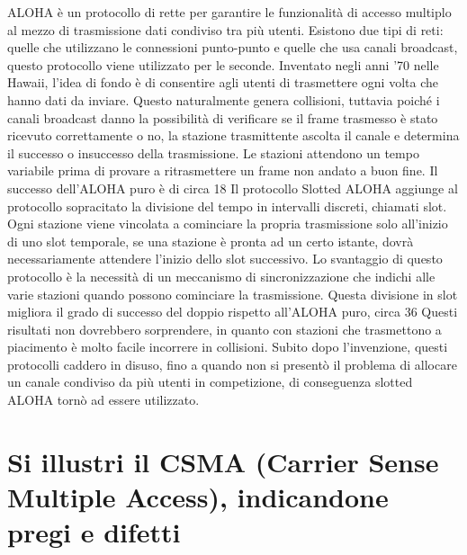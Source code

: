 ALOHA è un protocollo di rette per garantire le funzionalità di accesso multiplo al mezzo di trasmissione dati condiviso tra più utenti. Esistono due tipi di reti: quelle che utilizzano le connessioni punto-punto e quelle che usa canali broadcast, questo protocollo viene utilizzato per le seconde.
Inventato negli anni ’70 nelle Hawaii, l’idea di fondo è di consentire agli utenti di trasmettere ogni volta che hanno dati da inviare. Questo naturalmente genera collisioni, tuttavia poiché i canali broadcast danno la possibilità di verificare se il frame trasmesso è stato ricevuto correttamente o no, la stazione trasmittente ascolta il canale e determina il successo o insuccesso della trasmissione.
Le stazioni attendono un tempo variabile prima di provare a ritrasmettere un frame non andato a buon fine.
Il successo dell’ALOHA puro è di circa 18%
Il protocollo Slotted ALOHA aggiunge al protocollo sopracitato la divisione del tempo in intervalli discreti, chiamati slot. Ogni stazione viene vincolata a cominciare la propria trasmissione solo all’inizio di uno slot temporale, se una stazione è pronta ad un certo istante, dovrà necessariamente attendere l’inizio dello slot successivo.
Lo svantaggio di questo protocollo è la necessità di un meccanismo di sincronizzazione che indichi alle varie stazioni quando possono cominciare la trasmissione.
Questa divisione in slot migliora il grado di successo del doppio rispetto all’ALOHA puro, circa 36%
Questi risultati non dovrebbero sorprendere, in quanto con stazioni che trasmettono a piacimento è molto facile incorrere in collisioni.
Subito dopo l’invenzione, questi protocolli caddero in disuso, fino a quando non si presentò il problema di allocare un canale condiviso da più utenti in competizione, di conseguenza slotted ALOHA tornò ad essere utilizzato.
  


\section{Si illustri il CSMA (Carrier Sense Multiple Access), indicandone pregi e difetti}

